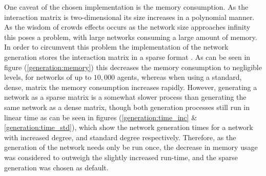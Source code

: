 \documentclass{article}
\begin{document}
One caveat of the chosen implementation is the memory consumption. As the interaction matrix is two-dimensional its size increases in a polynomial manner. As the wisdom of crowds effects occurs as the network size approaches infinity this poses a problem, with large networks consuming a large amount of memory. In order to circumvent this problem the implementation of the network generation stores the interaction matrix in a sparse format \cite{2020SciPy-NMeth}. As can be seen in figure (\ref{generation:memory}) this decreases the memory consumption to negligible levels, for networks of up to $10,000$ agents, whereas when using a standard, dense, matrix the memory consumption increases rapidly. \newline
However, generating a network as a sparse matrix is a somewhat slower process than generating the same network as a dense matrix, though both generation processes still run in linear time as can be seen in figures (\ref{generation:time_inc} \& \ref{generation:time_std}),  which show the network generation times for a network with increased degree, and standard degree respectively. Therefore, as the generation of the network needs only be run once, the decrease in memory usage was considered to outweigh the slightly increased run-time, and the sparse generation was chosen as default.
\end{document}
